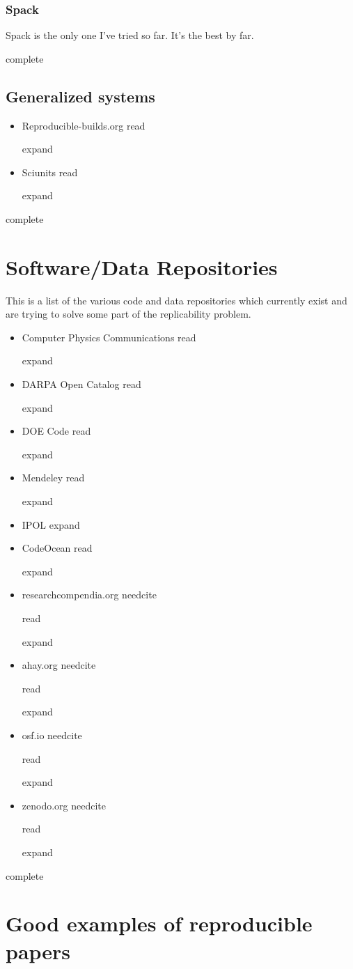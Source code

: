 \documentclass{article}
\newcommand{\Read}{
	\gls{read}
}
\newcommand{\complete}{
	\gls{complete}
}
\newcommand{\needcite}{
	\gls{needcite}
}
\newcommand{\expand}{
	\gls{expand}
}
\begin{document}
\subsubsection{Spack}

Spack \cite{Spack} is the only one I've tried so far. It's the best by far.

\complete

\subsection{Generalized systems}

\begin{itemize}
\item Reproducible-builds.org \cite{reproducible-builds} \Read \expand
\item Sciunits \cite{sciunits} \Read \expand
\end{itemize}

\complete

\section{Software/Data Repositories}

This is a list of the various code and data repositories which currently exist and are trying to solve some part of the replicability problem.

\begin{itemize}
\item Computer Physics Communications \cite{computer-physics-communications} \Read \expand
\item DARPA Open Catalog \cite{darpa-open-catalog} \Read \expand
\item DOE Code \cite{doe-code} \Read \expand
\item Mendeley \cite{elsevier-mendeley-computer-physics-communications} \Read \expand
\item IPOL \cite{ipol-website} \expand
\item CodeOcean \cite{codeocean-live} \Read \expand
\item researchcompendia.org \needcite \Read \expand
\item ahay.org \needcite \Read \expand
\item osf.io \needcite \Read \expand
\item zenodo.org \needcite \Read \expand 
\end{itemize}

\complete

\section{Good examples of reproducible papers}
\end{document}
